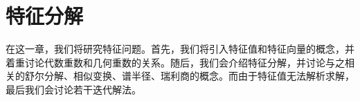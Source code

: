 \chapter{特征分解}

在这一章，我们将研究特征问题。首先，我们将引入特征值和特征向量的概念，并着重讨论代数重数和几何重数的关系。随后，我们会介绍特征分解，并讨论与之相关的舒尔分解、相似变换、谱半径、瑞利商的概念。而由于特征值无法解析求解，最后我们会讨论若干迭代解法。




